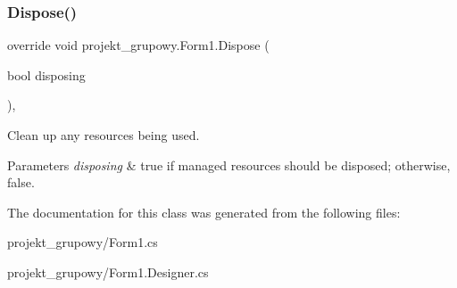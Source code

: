 \subsubsection{\texorpdfstring{Dispose()}{Dispose()}}
{\footnotesize\ttfamily override void projekt\+\_\+grupowy.\+Form1.\+Dispose (\begin{DoxyParamCaption}\item[{bool}]{disposing }\end{DoxyParamCaption})\hspace{0.3cm}{\ttfamily [inline]}, {\ttfamily [protected]}}



Clean up any resources being used. 


\begin{DoxyParams}{Parameters}
{\em disposing} & true if managed resources should be disposed; otherwise, false.\\
\hline
\end{DoxyParams}


The documentation for this class was generated from the following files\+:\begin{DoxyCompactItemize}
\item 
projekt\+\_\+grupowy/Form1.\+cs\item 
projekt\+\_\+grupowy/Form1.\+Designer.\+cs\end{DoxyCompactItemize}
